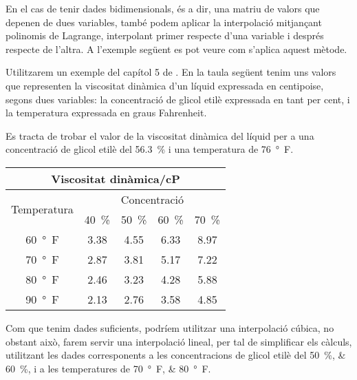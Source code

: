 En el cas de tenir dades bidimensionals, és a dir, una matriu de valors que depenen de dues variables, també podem aplicar la interpolació  mitjançant polinomis de Lagrange, interpolant primer respecte d'una variable i després respecte de l'altra. A l'exemple següent es pot veure com s'aplica aquest mètode.

	
\begin{exemple}\label{ex:InterpDuesDim}
	\addcontentsxms{\InterpDuesDim}	
    Utilitzarem un exemple del capítol 5 de \cite{EJB}. En la taula següent tenim uns valors que representen la viscositat dinàmica d'un líquid expressada en centipoise, segons dues variables: la concentració de glicol etilè
    expressada en tant per cent, i la temperatura expressada en graus Fahrenheit.
    
    Es tracta de trobar el valor de la viscositat dinàmica del líquid per a una concentració de glicol etilè
    del \qty{56,3}{\percent} i una temperatura de \qty{76}{\degree F}.

    \begin{center}
       \begin{tabular}{ccccc}
       \multicolumn{5}{c}{Viscositat dinàmica/cP}\\
       \toprule[1pt]
       \multirow{2}{25mm}{\rule{0mm}{4.5mm}Temperatura} & \multicolumn{4}{c}{Concentració}\\
       \cmidrule(rl){2-5}
                            & \qty{40}{\percent} & \qty{50}{\percent} & \qty{60}{\percent} & \qty{70}{\percent} \\
       \cmidrule(lr){1-5}
       \qty{60}{\degree F}  & \num{3,38}  & \num{4,55}  & \num{6,33}  & \num{8,97} \\
       \qty{70}{\degree F}  & \num{2,87}  & \num{3,81}  & \num{5,17}  & \num{7,22} \\
       \qty{80}{\degree F}  & \num{2,46}  & \num{3,23}  & \num{4,28}  & \num{5,88} \\
       \qty{90}{\degree F}  & \num{2,13}  & \num{2,76}  & \num{3,58}  & \num{4,85} \\
       \bottomrule[1pt]
       \end{tabular}
    \end{center}

    

    Com que tenim dades suficients, podríem utilitzar una interpolació cúbica, no obstant això, farem servir una interpolació lineal, per tal de simplificar els càlculs, utilitzant les dades corresponents  a les concentracions de glicol etilè del  \qtylist{50;60}{\percent}, i a les temperatures de  \qtylist{70;80}{\degree F}.


\end{exemple}
